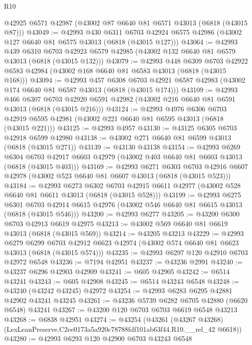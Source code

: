 \begin{lexlean}{R10}
\begin{coremodule}
    @42925
    @6571
    @42987
    (@43002 @87 @6640 @81 @6571 @43013 (@6818 (@43015 @87)))
@43049 := @42993
    @430
    @6311
    @6703
    @42924
    @6575
    @42986
    (@43002 @127 @6640 @81 @6575 @43013 (@6818 (@43015 @127)))
@43064 := @42993
    @439
    @6310
    @6703
    @42923
    @6579
    @42985
    (@43002 @132 @6640 @81 @6579 @43013 (@6818 (@43015 @132)))
@43079 := @42993
    @448
    @6309
    @6703
    @42922
    @6583
    @42984
    (@43002 @168 @6640 @81 @6583 @43013 (@6818 (@43015 @168)))
@43094 := @42993
    @457
    @6308
    @6703
    @42921
    @6587
    @42983
    (@43002 @174 @6640 @81 @6587 @43013 (@6818 (@43015 @174)))
@43109 := @42993
    @466
    @6307
    @6703
    @42920
    @6591
    @42982
    (@43002 @216 @6640 @81 @6591 @43013 (@6818 (@43015 @216)))
@43124 := @42993
    @4976
    @6306
    @6703
    @42919
    @6595
    @42981
    (@43002 @221 @6640 @81 @6595 @43013 (@6818 (@43015 @221)))
@43125 := @42993 @4957
@43130 := @43125 @6305 @6703 @42918 @6599 @42980
@43138 := @43002 @271 @6640 @81 @6599 @43013 (@6818 (@43015 @271))
@43139 := @43130 @43138
@43154 := @42993
    @6269
    @6304
    @6703
    @42917
    @6603
    @42979
    (@43002 @403 @6640 @81 @6603 @43013 (@6818 (@43015 @403)))
@43169 := @42993
    @6271
    @6303
    @6703
    @42916
    @6607
    @42978
    (@43002 @523 @6640 @81 @6607 @43013 (@6818 (@43015 @523)))
@43184 := @42993
    @6273
    @6302
    @6703
    @42915
    @6611
    @42977
    (@43002 @528 @6640 @81 @6611 @43013 (@6818 (@43015 @528)))
@43199 := @42993
    @6275
    @6301
    @6703
    @42914
    @6615
    @42976
    (@43002 @546 @6640 @81 @6615 @43013 (@6818 (@43015 @546)))
@43200 := @42993 @6277
@43205 := @43200 @6300 @6703 @42913 @6619 @42975
@43213 := @43002 @569 @6640 @81 @6619 @43013 (@6818 (@43015 @569))
@43214 := @43205 @43213
@43229 := @42993
    @6279
    @6299
    @6703
    @42912
    @6623
    @42974
    (@43002 @574 @6640 @81 @6623 @43013 (@6818 (@43015 @574)))
@43235 := @42993 @6297 @120 @42910 @6703 @42972 @6548
@43236 := @7194 @42951
@43237 := @43236 @2991
@43240 := @43237 @6296 @42903 @42909
@43241 := @605 @42905
@43242 := @6514 @43241
@43243 := @605 @42908
@43245 := @6514 @43243 @6548
@43248 := @43240 (@43242 @43245) @42972
@43254 := @42993 @6283 @6295 @42881 @42902 @43241 @43245
@43261 := @43236 @5739 @6282 @6705 @42880 (@6620 @6548) @43241
@43267 := @43200 @120 @6703 @6703 @6619 @6548 @43213
@43268 := @6838 @42951
@43274 := @43254
    (@43261 (@43267 @43268) (LexLeanPreserve.C2ee0173a5a920c78788fdf101ab63f44.R10.__rel_42 @6618))
@43280 := @42993 @6293 @120 @42900 @6703 @43243 @6548

\end{coremodule}
\end{lexlean}
